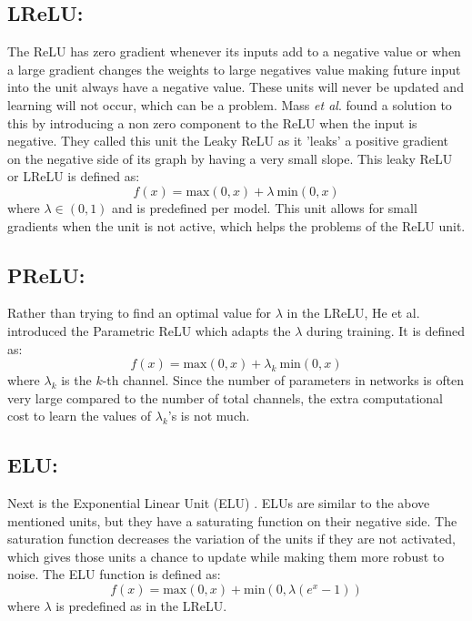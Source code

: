 \subsection{LReLU:}
The ReLU has zero gradient whenever its inputs add to a negative value or when a large gradient changes the weights to large negatives value making future input into the unit always have a negative value. 
These units will never be updated and learning will not occur, which can be a problem. 
Mass \textit{et al}. 
\cite{maas2013rectifier} found a solution to this by introducing a non zero component to the ReLU when the input is negative. 
They called this unit the Leaky ReLU as it 'leaks' a positive gradient on the negative side of its graph by having a very small slope. 
This leaky ReLU or LReLU is defined as:
\begin{equation}
f(x) = \mbox{max}(0,x) + \lambda ~\mbox{min}(0,x)
\label{e:lrelu}
\end{equation}
where $\lambda \in (0,1)$ and is predefined per model. 
This unit allows for small gradients when the unit is not active, which helps the problems of the ReLU unit.

\subsection{PReLU:}
Rather than trying to find an optimal value for $\lambda$ in the LReLU, He et al. \cite{he2015delving} introduced the Parametric ReLU which adapts the $\lambda$ during training. 
It is defined as:
\begin{equation}
f(x) = \mbox{max}(0,x) + \lambda_k ~\mbox{min}(0,x)
\label{e:prelu}
\end{equation}
where $\lambda_k$ is the $k$-th channel. 
Since the number of parameters in networks is often very large compared to the number of total channels, the extra computational cost to learn the values of $\lambda_k$'s is not much.

\subsection{ELU:}
Next is the Exponential Linear Unit (ELU) \cite{clevert2015fast}. 
ELUs are similar to the above mentioned units, but they have a saturating function on their negative side. 
The saturation function decreases the variation of the units if they are not activated, which gives those units a chance to update while making them more robust to noise. 
The ELU function is defined as:
\begin{equation}
f(x) = \mbox{max}(0,x) + \mbox{min}(0,\lambda(e^{x}-1))
\label{e:elu}
\end{equation}
where $\lambda$ is predefined as in the LReLU.

